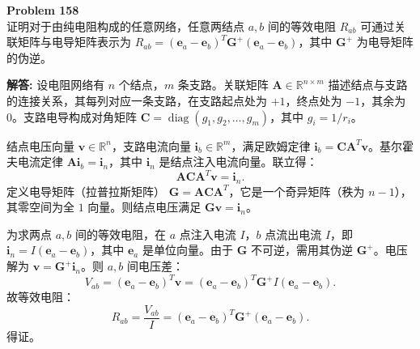 \documentclass[12pt, a4paper, oneside]{ctexart}
\newenvironment{solution}{\par\noindent\textbf{解答:}\quad}{\par}
\begin{document}
\begin{mdframed}[backgroundcolor=gray!10, linewidth=0pt]
    \textbf{Problem 158} \\
    证明对于由纯电阻构成的任意网络，任意两结点 $a,b$ 间的等效电阻 $R_{ab}$ 可通过关联矩阵与电导矩阵表示为 $R_{ab} = (\mathbf{e}_a - \mathbf{e}_b)^T \mathbf{G}^+ (\mathbf{e}_a - \mathbf{e}_b)$，其中 $\mathbf{G}^+$ 为电导矩阵的伪逆。
\end{mdframed}
\begin{solution}
    设电阻网络有 $n$ 个结点，$m$ 条支路。关联矩阵 $\mathbf{A} \in \mathbb{R}^{n \times m}$ 描述结点与支路的连接关系，其每列对应一条支路，在支路起点处为 $+1$，终点处为 $-1$，其余为 $0$。支路电导构成对角矩阵 $\mathbf{C} = \operatorname{diag}(g_1, g_2, \dots, g_m)$，其中 $g_i = 1/r_i$。

    结点电压向量 $\mathbf{v} \in \mathbb{R}^n$，支路电流向量 $\mathbf{i}_b \in \mathbb{R}^m$，满足欧姆定律 $\mathbf{i}_b = \mathbf{C} \mathbf{A}^T \mathbf{v}$。基尔霍夫电流定律 $\mathbf{A} \mathbf{i}_b = \mathbf{i}_n$，其中 $\mathbf{i}_n$ 是结点注入电流向量。联立得：
    \[
    \mathbf{A} \mathbf{C} \mathbf{A}^T \mathbf{v} = \mathbf{i}_n.
    \]
    定义电导矩阵（拉普拉斯矩阵） $\mathbf{G} = \mathbf{A} \mathbf{C} \mathbf{A}^T$，它是一个奇异矩阵（秩为 $n-1$），其零空间为全 $1$ 向量。则结点电压满足 $\mathbf{G} \mathbf{v} = \mathbf{i}_n$。

    为求两点 $a,b$ 间的等效电阻，在 $a$ 点注入电流 $I$，$b$ 点流出电流 $I$，即 $\mathbf{i}_n = I(\mathbf{e}_a - \mathbf{e}_b)$，其中 $\mathbf{e}_a$ 是单位向量。由于 $\mathbf{G}$ 不可逆，需用其伪逆 $\mathbf{G}^+$。电压解为 $\mathbf{v} = \mathbf{G}^+ \mathbf{i}_n$。则 $a,b$ 间电压差：
    \[
    V_{ab} = (\mathbf{e}_a - \mathbf{e}_b)^T \mathbf{v} = (\mathbf{e}_a - \mathbf{e}_b)^T \mathbf{G}^+ I (\mathbf{e}_a - \mathbf{e}_b).
    \]
    故等效电阻：
    \[
    R_{ab} = \frac{V_{ab}}{I} = (\mathbf{e}_a - \mathbf{e}_b)^T \mathbf{G}^+ (\mathbf{e}_a - \mathbf{e}_b).
    \]
    得证。
\end{solution}
\end{document}
